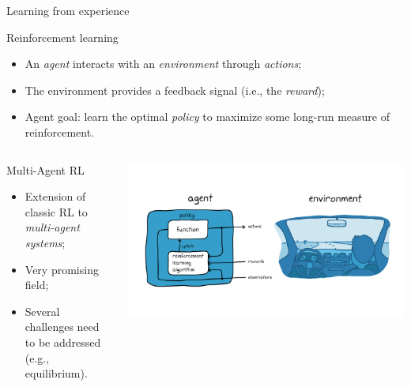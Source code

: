 \documentclass[presentation]{beamer}\mode<presentation>{\usetheme{AMSBolognaFC}}
\begin{document}



\begin{frame}[c]{Learning from experience}

\begin{block}{Reinforcement learning}
	\begin{itemize}
		\item An \emph{agent} interacts with an \emph{environment} through \emph{actions};
		\item The environment provides a feedback signal (i.e., the \emph{reward});
		\item Agent goal: learn the optimal \emph{policy} to maximize some long-run measure of reinforcement.
	\end{itemize}
\end{block}


\begin{columns}
	\begin{column}{0.5\textwidth}
		\begin{alertblock}{Multi-Agent RL}
			\begin{itemize}
				\item Extension of classic RL to \emph{multi-agent systems};
				\item Very promising field;
				\item Several challenges need to be addressed (e.g., equilibrium).
			\end{itemize}
		\end{alertblock}
	\end{column}
	\begin{column}{0.5\textwidth}
		\includegraphics[width=\textwidth]{img/rl.png}
	\end{column}
\end{columns}


\end{frame}
\end{document}
